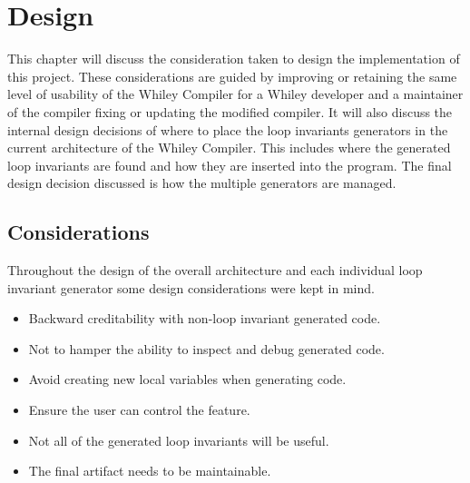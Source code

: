 \chapter{Design}\label{C:design}
%

%

This chapter will discuss the consideration taken to design the implementation
of this project.
These considerations are guided by improving or retaining the same level of 
usability of the Whiley Compiler for a Whiley developer and a maintainer of the
compiler fixing or updating the modified compiler. 
It will also discuss the internal design decisions of
where to place the loop invariants generators in the
current architecture of the Whiley Compiler.
This includes where the generated loop invariants are found and
how they are inserted into the program.
The final design decision discussed is how the multiple generators are managed.


\section{Considerations}

Throughout the design of the overall architecture and each individual loop invariant
generator some design considerations were kept in mind.
\begin{itemize}
    \item{Backward creditability with non-loop invariant generated code.}
    \item{Not to hamper the ability to inspect and debug generated code.}
    \item{Avoid creating new local variables when generating code.}
    \item{Ensure the user can control the feature.}
    \item{Not all of the generated loop invariants will be useful.}
    \item{The final artifact needs to be maintainable.}
\end{itemize}

